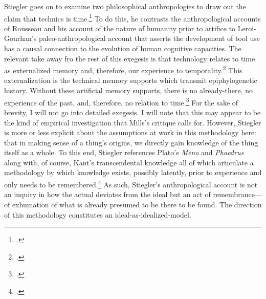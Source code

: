 \documentclass[letterpaper,notitlepage,12pt]{article}
\begin{document}
Stiegler goes on to examine two philosophical anthropologies to draw out the
claim that technics is time.\footcite[p. 83--5]{stiegler_technics_1998}
To do this, he contrasts the anthropological accounts of Rousseau and his
account of the nature of humanity prior to artifice to Leroi-Gourhan's
paleo-anthropological account that asserts the development of tool use has a
causal connection to the evolution of human cognitive capacities.
The relevant take away fro the rest of this exegesis is that technology relates
to time as externalized memory and, therefore, our experience to
temporality.\footcite[p. 172--4]{stiegler_technics_1998}
This externalization is the technical memory supports which transmit
epiphylogenetic history.
Without these artificial memory supports, there is no already-there, no
experience of the past, and, therefore, no relation to time.\footcite[p.
159]{stiegler_technics_1998}
For the sake of brevity, I will not go into detailed exegesis.
I will note that this may appear to be the kind of empirical investigation that
Mills's critique calls for.
However, Stiegler is more or less explicit about the assumptions at work in this
methodology here: that in making sense of a thing's origins, we directly gain
knowledge of the thing itself as a whole.
To this end, Stiegler references Plato's \textit{Meno} and \textit{Phaedrus}
along with, of course, Kant's transcendental knowledge all of which articulate a
methodology by which knowledge exists, possibly latently, prior to experience
and only needs to be remembered.\footcite[p. 95--100]{stiegler_technics_1998}
As such, Stiegler's anthropological account is not an inquiry in how the actual
deviates from the ideal but an act of remembrance---of exhumation of what is
already presumed to be there to be found.
The direction of this methodology constitutes an ideal-as-idealized-model.
\end{document}
